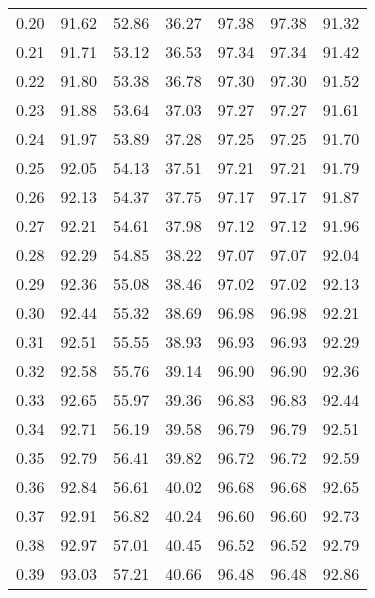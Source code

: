 \begin{tabular}{|c|c|c|c|c|c|c|}
      0.20 &     91.62 &     52.86 &      36.27 &   97.38 &      97.38 &         91.32 \\
      0.21 &     91.71 &     53.12 &      36.53 &   97.34 &      97.34 &         91.42 \\
      0.22 &     91.80 &     53.38 &      36.78 &   97.30 &      97.30 &         91.52 \\
      0.23 &     91.88 &     53.64 &      37.03 &   97.27 &      97.27 &         91.61 \\
      0.24 &     91.97 &     53.89 &      37.28 &   97.25 &      97.25 &         91.70 \\
      0.25 &     92.05 &     54.13 &      37.51 &   97.21 &      97.21 &         91.79 \\
      0.26 &     92.13 &     54.37 &      37.75 &   97.17 &      97.17 &         91.87 \\
      0.27 &     92.21 &     54.61 &      37.98 &   97.12 &      97.12 &         91.96 \\
      0.28 &     92.29 &     54.85 &      38.22 &   97.07 &      97.07 &         92.04 \\
      0.29 &     92.36 &     55.08 &      38.46 &   97.02 &      97.02 &         92.13 \\
      0.30 &     92.44 &     55.32 &      38.69 &   96.98 &      96.98 &         92.21 \\
      0.31 &     92.51 &     55.55 &      38.93 &   96.93 &      96.93 &         92.29 \\
      0.32 &     92.58 &     55.76 &      39.14 &   96.90 &      96.90 &         92.36 \\
      0.33 &     92.65 &     55.97 &      39.36 &   96.83 &      96.83 &         92.44 \\
      0.34 &     92.71 &     56.19 &      39.58 &   96.79 &      96.79 &         92.51 \\
      0.35 &     92.79 &     56.41 &      39.82 &   96.72 &      96.72 &         92.59 \\
      0.36 &     92.84 &     56.61 &      40.02 &   96.68 &      96.68 &         92.65 \\
      0.37 &     92.91 &     56.82 &      40.24 &   96.60 &      96.60 &         92.73 \\
      0.38 &     92.97 &     57.01 &      40.45 &   96.52 &      96.52 &         92.79 \\
      0.39 &     93.03 &     57.21 &      40.66 &   96.48 &      96.48 &         92.86 \\

\end{tabular}
